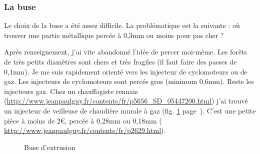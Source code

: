 \subsubsection{La buse}%
Le choix de la buse a été assez difficile. La problématique est la suivante : où trouver %
une partie métallique percée à 0,3mm ou moins pour pas cher ? \par%
Après renseignement, j'ai vite abandonné l'idée de percer moi-même. Les forêts de très petits %
diamètres sont chers et très fragiles (il faut faire des passes de 0,1mm).%
Je me suis rapidement orienté vers les injecteur de cyclomoteurs ou de gaz. Les injecteurs de %
cyclomoteurs sont percés gros (minimum 0,6mm). Reste les injecteurs gaz. Chez un chauffagiste %
rennais (\url{http://www.jeanpaulguy.fr/contents/fr/p5656_SD_05447200.html}) j'ai trouvé un injecteur de veilleuse de chaudière murale à gaz (fig. \ref{buse} %
page~\pageref{buse}). C'est une petite pièce à moins de 2\euro, percée à 0,28mm ou 0,18mm (%
\url{http://www.jeanpaulguy.fr/contents/fr/p2629.html}).%
\begin{figure}%
   \caption{\label{buse} Buse d'extrusion}%
\end{figure}%